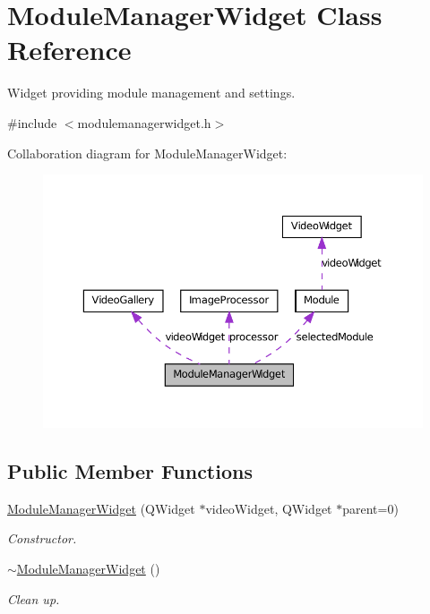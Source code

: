 \hypertarget{class_module_manager_widget}{
\section{ModuleManagerWidget Class Reference}
\label{dd/da9/class_module_manager_widget}
}


Widget providing module management and settings.  




{\ttfamily \#include $<$modulemanagerwidget.h$>$}



Collaboration diagram for ModuleManagerWidget:
\nopagebreak
\begin{figure}[H]
\begin{center}
\leavevmode
\includegraphics[width=369pt]{d4/d04/class_module_manager_widget__coll__graph}
\end{center}
\end{figure}
\subsection*{Public Member Functions}
\begin{DoxyCompactItemize}
\item 
\hyperlink{class_module_manager_widget_a37d02cb7f61ed428c3a50ba560caadbb}{ModuleManagerWidget} (QWidget $\ast$videoWidget, QWidget $\ast$parent=0)
\begin{DoxyCompactList}\small\item\em Constructor. \item\end{DoxyCompactList}\item 
\hypertarget{class_module_manager_widget_ad1e98e2130ca8f219a851a25d7ece061}{
\hyperlink{class_module_manager_widget_ad1e98e2130ca8f219a851a25d7ece061}{$\sim$ModuleManagerWidget} ()}
\label{dd/da9/class_module_manager_widget_ad1e98e2130ca8f219a851a25d7ece061}

\begin{DoxyCompactList}\small\item\em Clean up. \item\end{DoxyCompactList}\end{DoxyCompactItemize}


